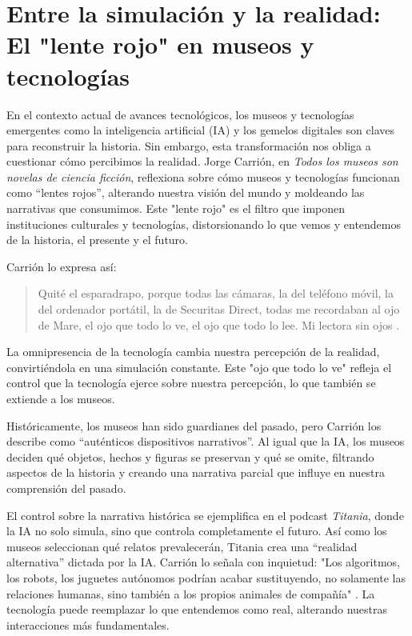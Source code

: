 \documentclass[
  spanish,
  11pt,
  a4paper,
]{scrbook}
\begin{document}
\section*{Entre la simulación y la realidad: El "lente rojo" en museos y
tecnologías}\label{entre-la-simulaciuxf3n-y-la-realidad-el-lente-rojo-en-museos-y-tecnologuxedas}


En el contexto actual de avances tecnológicos, los museos y tecnologías
emergentes como la inteligencia artificial (IA) y los gemelos digitales
son claves para reconstruir la historia. Sin embargo, esta
transformación nos obliga a cuestionar cómo percibimos la realidad.
Jorge Carrión, en \emph{Todos los museos son novelas de ciencia
ficción}, reflexiona sobre cómo museos y tecnologías funcionan como
``lentes rojos'', alterando nuestra visión del mundo y moldeando las
narrativas que consumimos. Este "lente rojo" es el filtro que imponen
instituciones culturales y tecnologías, distorsionando lo que vemos y
entendemos de la historia, el presente y el futuro.

Carrión lo expresa así:

\begin{quote}
Quité el esparadrapo, porque todas las cámaras, la del teléfono móvil,
la del ordenador portátil, la de Securitas Direct, todas me recordaban
al ojo de Mare, el ojo que todo lo ve, el ojo que todo lo lee. Mi
lectora sin ojos \autocite[48]{Carrion2022}.
\end{quote}

La omnipresencia de la tecnología cambia nuestra percepción de la
realidad, convirtiéndola en una simulación constante. Este "ojo que todo
lo ve" refleja el control que la tecnología ejerce sobre nuestra
percepción, lo que también se extiende a los museos.

Históricamente, los museos han sido guardianes del pasado, pero Carrión
los describe como ``auténticos dispositivos narrativos''. Al igual que
la IA, los museos deciden qué objetos, hechos y figuras se preservan y
qué se omite, filtrando aspectos de la historia y creando una narrativa
parcial que influye en nuestra comprensión del pasado.

El control sobre la narrativa histórica se ejemplifica en el podcast
\emph{Titania}, donde la IA no solo simula, sino que controla
completamente el futuro. Así como los museos seleccionan qué relatos
prevalecerán, Titania crea una ``realidad alternativa'' dictada por la
IA. Carrión lo señala con inquietud: "Los algoritmos, los robots, los
juguetes autónomos podrían acabar sustituyendo, no solamente las
relaciones humanas, sino también a los propios animales de compañía"
\autocite[50-51]{Carrion2022}. La tecnología puede reemplazar lo que
entendemos como real, alterando nuestras interacciones más
fundamentales.
\end{document}
